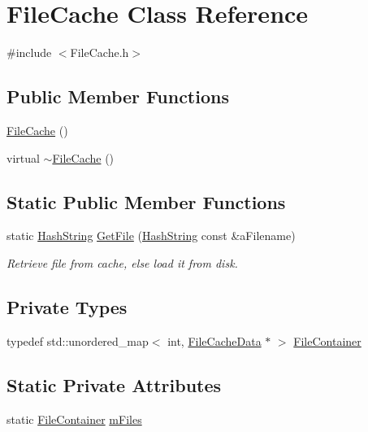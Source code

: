 \hypertarget{classFileCache}{}\section{File\+Cache Class Reference}
\label{classFileCache}


{\ttfamily \#include $<$File\+Cache.\+h$>$}

\subsection*{Public Member Functions}
\begin{DoxyCompactItemize}
\item 
\hyperlink{classFileCache_a1a4e307539183d00d50038cd0517c5b7}{File\+Cache} ()
\item 
virtual \hyperlink{classFileCache_a07c4e05a6d3d792685b48fba44142e08}{$\sim$\+File\+Cache} ()
\end{DoxyCompactItemize}
\subsection*{Static Public Member Functions}
\begin{DoxyCompactItemize}
\item 
static \hyperlink{classHashString}{Hash\+String} \hyperlink{classFileCache_a5faf02dd4d56bf7cbdc44f322939be25}{Get\+File} (\hyperlink{classHashString}{Hash\+String} const \&a\+Filename)
\begin{DoxyCompactList}\small\item\em Retrieve file from cache, else load it from disk. \end{DoxyCompactList}\end{DoxyCompactItemize}
\subsection*{Private Types}
\begin{DoxyCompactItemize}
\item 
typedef std\+::unordered\+\_\+map$<$ int, \hyperlink{classFileCacheData}{File\+Cache\+Data} $\ast$ $>$ \hyperlink{classFileCache_a7055a28a780b807c669312485540f558}{File\+Container}
\end{DoxyCompactItemize}
\subsection*{Static Private Attributes}
\begin{DoxyCompactItemize}
\item 
static \hyperlink{classFileCache_a7055a28a780b807c669312485540f558}{File\+Container} \hyperlink{classFileCache_ab0e3756eb0bd259d08f5eb0f33d77bf1}{m\+Files}
\end{DoxyCompactItemize}


